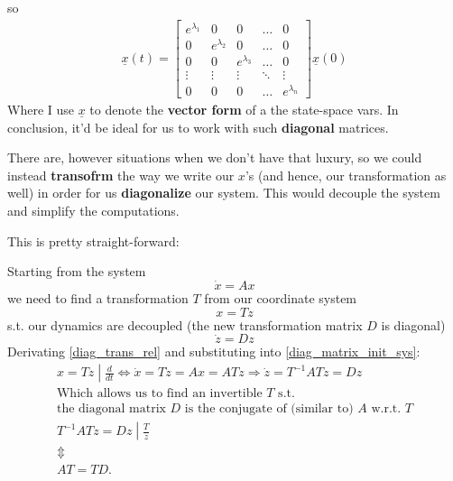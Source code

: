 so
\begin{align*}
	\underline{x}(t) =
	\begin{bmatrix}
		e^{\lambda_1} & 0             & 0             & \dots  & 0             \\
		0             & e^{\lambda_2} & 0             & \dots  & 0             \\
		0             & 0             & e^{\lambda_3} & \dots  & 0             \\
		\vdots        & \vdots        & \vdots        & \ddots & \vdots        \\
		0             & 0             & 0             & \dots  & e^{\lambda_n}
	\end{bmatrix}
	\underline{x}(0)
\end{align*}
Where I use $\underline{x}$ to denote the \textbf{vector form} of a the state-space vars.
In conclusion, it'd be ideal for us to work with such \textbf{diagonal} matrices.

There are, however situations when we don't have that luxury, so we could instead \textbf{transofrm} the way we write our $x$'s (and hence, our transformation as well) in order for us \textbf{diagonalize} our system. This would decouple the system and simplify the computations.

This is pretty straight-forward:

Starting from the system
\begin{equation}\label{diag_matrix_init_sys}
	\dot{x} = A x
\end{equation}
we need to find a transformation $T$ from our coordinate system
\begin{equation}\label{diag_trans_rel}
	x = Tz
\end{equation}
s.t. our dynamics are decoupled (the new transformation matrix $D$ is diagonal)
\[
	\dot{z} = Dz
\]
Derivating \ref{diag_trans_rel} and substituting into \ref{diag_matrix_init_sys}:
\begin{gather*}
	\left. x = Tz \middle| \frac{d}{dt} \right. \iff
	\dot{x} = T\dot{z} = Ax = ATz \Rightarrow \dot{z} = T^{-1} A T z = Dz \\
	\text{Which allows us to find an invertible } T \text{ s.t.} \\
	\text{the diagonal matrix } D \text{ is the conjugate of (similar to) } A \text{ w.r.t. } T \\
	\left. T^{-1} A T z = Dz \middle| \frac{T}{z}
	\right. \\
	\Updownarrow \\
	A T = T D.
\end{gather*}

